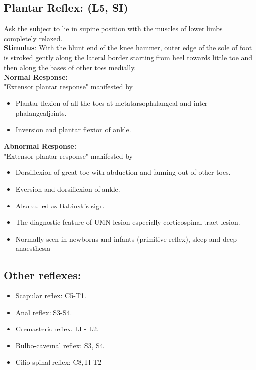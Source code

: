 \documentclass[a4paper,12pt]{book}
\begin{document}
\subsection*{Plantar Reflex: (L5, SI)}
Ask the subject to lie in supine position with the muscles of lower limbs completely relaxed.\\
\textbf{Stimulus}: With the blunt end of the knee hammer, outer edge of the sole of foot is stroked gently along the lateral border starting from heel towards little toe and then along the bases of other toes medially.\\
\textbf{Normal Response: }\\
"Extensor plantar response" manifested by
\begin{itemize}
\item{Plantar flexion of all the toes at metatarsophalangeal and inter phalangealjoints.}
\item{Inversion and plantar flexion of ankle.}
\end{itemize}
\textbf{Abnormal Response:}\\
"Extensor plantar response" manifested by
\begin{itemize}
\item{Dorsiflexion of great toe with abduction and fanning out of other toes.}
\item{Eversion and dorsiflexion of ankle.}
\item{Also called as Babinsk's sign.}
\item{The diagnostic feature of UMN lesion especially corticospinal tract lesion.}
\item{Normally seen in newborns and infants (primitive reflex), sleep and deep anaesthesia.}
\end{itemize}
\subsection*{Other reflexes:}
\begin{itemize}
\item{Scapular reflex: C5-T1.}
\item{Anal reflex: S3-S4.}
\item{Cremasteric reflex: LI - L2.}
\item{Bulbo-cavernal reflex: S3, S4.}
\item{Cilio-spinal reflex: C8,Tl-T2.}
\end{itemize}
\end{document}
